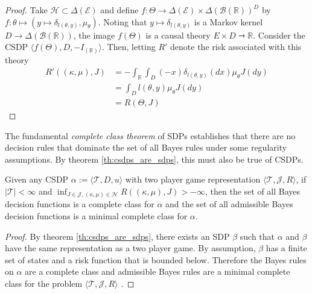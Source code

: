 \begin{proof}
Take $\mathscr{H}\subset\Delta(\mathcal{E})$ and define $f:\Theta\to \Delta(\mathcal{E})\times \Delta(\mathcal{B}(\mathbb{R}))^D$ by $f:\theta\mapsto (y\mapsto \delta_{l(\theta,y)},\mu_\theta)$. Noting that $y\mapsto \delta_{l(\theta,y)}$ is a Markov kernel $D\to \Delta(\mathcal{B}(\mathbb{R}))$, the image $f(\Theta)$ is a causal theory $E\times D\rightarrowtriangle \mathbb{R}$. Consider the CSDP $\langle f(\Theta),D,-I_{(\mathbb{R})}\rangle$. Then, letting $R'$ denote the risk associated with this theory
\begin{align}
 R'((\kappa,\mu),J) &= -\int_\mathbb{R} \int_D (-x) \delta_{l(\theta,y)}(dx) \mu_\theta J(dy)\\
                    &= \int_D l(\theta,y) \mu_\theta J(dy)\\
                    &= R(\Theta,J)
\end{align}
\end{proof}

The fundamental \emph{complete class theorem} of SDPs establishes that there are no decision rules that dominate the set of all Bayes rules under some regularity assumptions. By theorem \ref{th:csdps_are_sdps}, this must also be true of CSDPs.

\begin{theorem}\label{th:complete_class}
Given any CSDP $\alpha:=\langle \mathscr{T},D,u\rangle$ with two player game representation $\langle \mathscr{T},\mathscr{J},R\rangle$, if $|\mathscr{T}|<\infty$ and $\inf_{J\in\mathscr{J},(\kappa,\mu)\in\mathscr{H}} R((\kappa,\mu),J)>-\infty$, then the set of all Bayes decision functions is a complete class for $\alpha$ and the set of all admissible Bayes decision functions is a minimal complete class for $\alpha$.
\end{theorem}

\begin{proof}
By theorem \ref{th:csdps_are_sdps}, there exists an SDP $\beta$ such that $\alpha$ and $\beta$ have the same representation as a two player game. By assumption, $\beta$ has a finite set of states and a risk function that is bounded below. Therefore the Bayes rules on $\alpha$ are a complete class and admissible Bayes rules are a minimal complete class for the problem $\langle \mathscr{T},\mathscr{J},R\rangle$ \citep{toutenburg_ferguson_1967}.
\end{proof}


